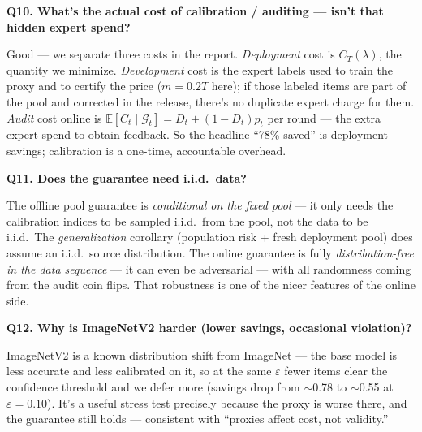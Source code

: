 \documentclass[11pt]{article}
\newcommand{\eps}{\varepsilon}
\newcommand{\calG}{\mathcal{G}}
\newcommand{\E}{\mathbb{E}}
\newcommand{\qsection}[1]{%
  \par\vspace{0.7\baselineskip}%
  {\large\bfseries\color{blue!45!black}#1}\par
  \vspace{0.2\baselineskip}}
\begin{document}
\qsection{Q10. What's the actual cost of calibration / auditing --- isn't that hidden expert spend?}
Good --- we separate three costs in the report. \emph{Deployment} cost is
$C_T(\lambda)$, the quantity we minimize. \emph{Development} cost is the expert
labels used to train the proxy and to certify the price ($m=0.2T$ here); if those
labeled items are part of the pool and corrected in the release, there's no
duplicate expert charge for them. \emph{Audit} cost online is
$\E[C_t\mid\calG_t]=D_t+(1-D_t)p_t$ per round --- the extra expert spend to obtain
feedback. So the headline ``78\% saved'' is deployment savings; calibration is a
one-time, accountable overhead.

\qsection{Q11. Does the guarantee need i.i.d.\ data?}
The offline pool guarantee is \emph{conditional on the fixed pool} --- it only
needs the calibration indices to be sampled i.i.d.\ from the pool, not the data
to be i.i.d.\ The \emph{generalization} corollary (population risk + fresh
deployment pool) does assume an i.i.d.\ source distribution. The online guarantee
is fully \emph{distribution-free in the data sequence} --- it can even be
adversarial --- with all randomness coming from the audit coin flips. That
robustness is one of the nicer features of the online side.

\qsection{Q12. Why is ImageNetV2 harder (lower savings, occasional violation)?}
ImageNetV2 is a known distribution shift from ImageNet --- the base model is less
accurate and less calibrated on it, so at the same $\eps$ fewer items clear the
confidence threshold and we defer more (savings drop from $\sim$0.78 to
$\sim$0.55 at $\eps=0.10$). It's a useful stress test precisely because the proxy
is worse there, and the guarantee still holds --- consistent with ``proxies
affect cost, not validity.''
\end{document}
